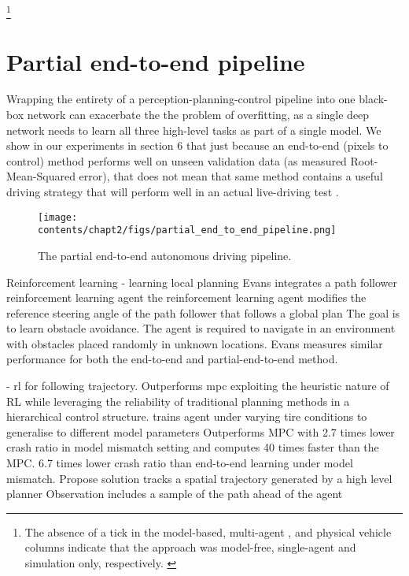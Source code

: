 \begin{landscape}
    
    \footnote{The absence of a tick in the model-based, multi-agent , and physical vehicle columns indicate that the approach was model-free, single-agent and simulation only, respectively. \label{footnote_1}}
\end{landscape}



\section{Partial end-to-end pipeline}
\label{sec:partial_end_to_end}

Wrapping the entirety of a perception-planning-control
pipeline into one black-box network can exacerbate the the problem of overfitting, as a single deep network needs to learn all three high-level tasks as part of a single model. We show in our experiments in section 6 that just because an end-to-end (pixels to control) method performs well on unseen validation data (as measured Root-Mean-Squared error), that does not mean that same method contains a useful driving strategy that will perform well in an actual live-driving test \cite{Weiss2020a}.

\begin{figure}[h]
    \centering
    \texttt{[image: contents/chapt2/figs/partial\_end\_to\_end\_pipeline.png]}
    \caption{The partial end-to-end autonomous driving pipeline.}
    \label{fig:partial_end_to_end}
\end{figure}

Reinforcement learning
\cite{Evans2021b} - learning local planning
Evans integrates a path follower reinforcement learning agent
the reinforcement learning agent modifies the reference steering angle of the path follower that follows a global plan
The goal is to learn obstacle avoidance.
The agent is required to navigate in an environment with obstacles placed randomly in unknown locations.
Evans measures similar performance for both the end-to-end and partial-end-to-end method.


\cite{Ghignone2022} - rl for following trajectory. Outperforms mpc
exploiting the heuristic nature of RL while leveraging the reliability of traditional planning methods in a hierarchical control structure.
trains agent under varying tire conditions to generalise to different model parameters
Outperforms MPC with 2.7 times lower crash ratio in model mismatch setting
and computes 40 times faster than the MPC.
6.7 times lower crash ratio than end-to-end learning under model mismatch.
Propose solution tracks a spatial trajectory generated by a high level planner
Observation includes a sample of the path ahead of the agent




